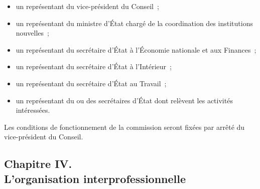 \documentclass[french,twoside]{book} %
\begin{document}
\begin{itemize}[itemsep=0pt,]
\item un représentant du vice-président du Conseil ;
\item un représentant du ministre d’État chargé de la coordination des institutions nouvelles ;
\item un représentant du secrétaire d’État à l’Économie nationale et aux Finances ;
\item un représentant du secrétaire d’État à l’Intérieur ;
\item un représentant du secrétaire d’État au Travail ;
\item un représentant du ou des secrétaires d’État dont relèvent les activités intéressées.
\end{itemize}

\noindent Les conditions de fonctionnement de la commission seront fixées par arrêté du vice-président du Conseil.

\subsection[{Chapitre IV. L’organisation interprofessionnelle}]{Chapitre IV. \\
L’organisation interprofessionnelle}
\end{document}
